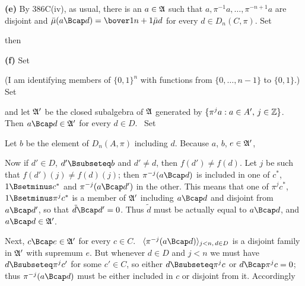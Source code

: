 {\medskip

{\bf (e)} By 386C(iv), as usual, there is an $a\in\frak A$ such that
$a,\pi^{-1}a,\ldots,\pi^{-n+1}a$ are disjoint and
$\bar\mu(a\Bcap d)=\bover1{n+1}\bar\mu d$ for every $d\in D_n(C,\pi)$.
Set


\noindent then


\medskip

{\bf (f)} Set


\noindent (I am identifying members of $\{0,1\}^n$ with functions from
$\{0,\ldots,n-1\}$ to $\{0,1\}$.)   Set


\noindent and let $\frak A'$ be the closed subalgebra of $\frak A$
generated by $\{\pi^ja:a\in A',\,j\in\Bbb Z\}$.   Then
$a\Bcap d\in\frak A'$ for every $d\in D$.   \Prf\ Set


\noindent Let $b$ be the element of $D_n(A,\pi)$ including $d$.  Because
$a$, $b$, $e\in\frak A'$,


\noindent Now if $d'\in D$, $d'\Bsubseteq b$ and $d'\ne d$, then
$f(d')\ne f(d)$.   Let $j$ be such that $f(d')(j)\ne f(d)(j)$;  then
$\pi^{-j}(a\Bcap d)$ is included in one of $c^*$, $1\Bsetminus c^*$ and
$\pi^{-j}(a\Bcap d')$ in the other.   This means that one of $\pi^jc^*$,
$1\Bsetminus\pi^jc^*$ is a member of $\frak A'$ including $a\Bcap d$ and
disjoint from $a\Bcap d'$, so that $\tilde d\Bcap d'=0$.   Thus
$\tilde d$ must be actually equal to $a\Bcap d$, and $a\Bcap d\in\frak
A'$.\ \Qed

Next, $c\Bcap e\in\frak A'$ for every $c\in C$.   \Prf\
$\langle \pi^{-j}(a\Bcap d)\rangle_{j<n,\,d\in D}$ is a disjoint family
in $\frak A'$ with supremum $e$.   But whenever $d\in D$ and $j<n$ we must have $d\Bsubseteq\pi^jc'$ for some $c'\in C$, so either
$d\Bsubseteq\pi^jc$ or $d\Bcap\pi^jc=0$;  thus $\pi^{-j}(a\Bcap d)$ must
be either included in $c$ or disjoint from it.   Accordingly

}
